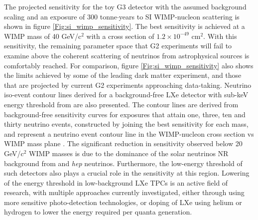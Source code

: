 The projected sensitivity for the toy G3 detector with the assumed background scaling and an exposure of 300 tonne$\cdot$years to SI WIMP-nucleon scattering is shown in figure \ref{Fig:si_wimp_sensitivity}. The best sensitivity is achieved at a WIMP mass of 40 GeV/c$^{2}$ with a cross section of $1.2 \times 10^{-49}$ cm$^{2}$. With this sensitivity, the remaining parameter space that G2 experiments will fail to examine above the coherent scattering of neutrinos from astrophysical sources is comfortably reached. For comparison, figure \ref{Fig:si_wimp_sensitivity} also shows the limits achieved by some of the leading dark matter experiment, and those that are projected by current G2 experiments approaching data-taking. Neutrino iso-event contour lines derived for a background-free LXe detector with sub-keV energy threshold from \cite{neutrino_floor} are also presented. The contour lines are derived from background-free sensitivity curves for exposures that attain one, three, ten and thirty neutrino events, constructed by joining the best sensitivity for each mass, and represent a neutrino event contour line in the WIMP-nucleon cross section vs WIMP mass plane \cite{Billard:2013qya}. The significant reduction in sensitivity observed below 20 GeV/c$^{2}$ WIMP masses is due to the dominance of the solar neutrinos NR background from \BE{} and \textit{hep} neutrinos. Furthermore, the low-energy threshold of such detectors also plays a crucial role in the sensitivity at this region. Lowering of the energy threshold in low-background LXe TPCs is an active field of research, with multiple approaches currently investigated, either through using more sensitive photo-detection technologies, or doping of LXe using helium or hydrogen to lower the energy required per quanta generation. 


